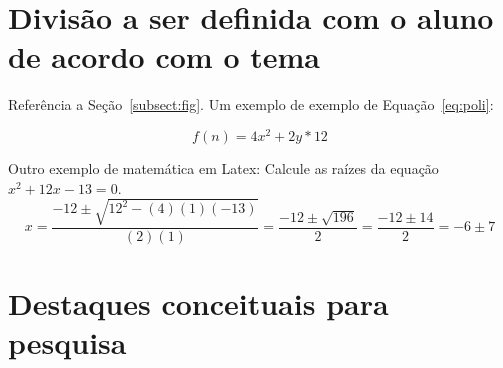 \section{Divisão a ser definida com o aluno de acordo com o tema}


Referência a Seção~\ref{subsect:fig}. Um exemplo de exemplo de Equação~\ref{eq:poli}:

\begin{equation}
\label{eq:poli}
    f(n) = 4x^2 + 2y*12
\end{equation}

Outro exemplo de matemática em Latex: Calcule as raízes da equação $x^2 + 12x - 13 = 0$.
\begin{equation}
 x = \frac{-12 \pm \sqrt{12^2 - (4)(1)(-13)}}{(2)(1)} = \frac{-12 \pm \sqrt{196}}{2} = \frac{-12 \pm 14}{2} = -6 \pm 7
\end{equation}



\section{Destaques conceituais para pesquisa}





	
	